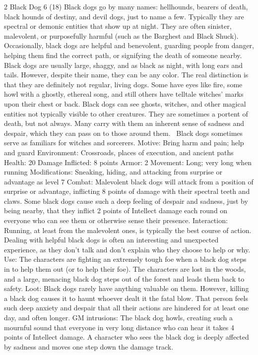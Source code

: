 \begin{multicols}{2}
Black Dog 6 (18)
Black dogs go by many names: hellhounds, bearers of death, black hounds of destiny, and devil dogs, just to name a few. Typically they are spectral or demonic entities that show up at night. They are often sinister, malevolent, or purposefully harmful (such as the Barghest and Black Shuck). Occasionally, black dogs are helpful and benevolent, guarding people from danger, helping them find the correct path, or signifying the death of someone nearby.
Black dogs are usually large, shaggy, and as black as night, with long ears and tails. However, despite their name, they can be any color. The real distinction is that they are definitely not regular, living dogs. Some have eyes like fire, some howl with a ghostly, ethereal song, and still others have telltale witches’ marks upon their chest or back.
Black dogs can see ghosts, witches, and other magical entities not typically visible to other creatures. They are sometimes a portent of death, but not always. Many carry with them an inherent sense of sadness and despair, which they can pass on to those around them. 
	Black dogs sometimes serve as familiars for witches and sorcerers.
Motive: Bring harm and pain; help and guard
Environment: Crossroads, places of execution, and ancient paths Health: 20
Damage Inflicted: 8 points
Armor: 2
Movement: Long; very long when running
Modifications: Sneaking, hiding, and attacking from surprise or advantage as level 7 Combat: Malevolent black dogs will attack from a position of surprise or advantage,
inflicting 8 points of damage with their spectral teeth and claws. Some black dogs cause such a deep feeling of despair and sadness, just by being nearby, that they inflict 2 points of Intellect damage each round on everyone who can see them or otherwise sense their presence.
Interaction: Running, at least from the malevolent ones, is typically the best course
of action. Dealing with helpful black dogs is often an interesting and unexpected
experience, as they don’t talk and don’t explain who they choose to help or why. 
Use: The characters are fighting an extremely tough foe when a black dog steps in to
help them out (or to help their foe). The characters are lost in the woods, and a large,
menacing black dog steps out of the forest and leads them back to safety.
Loot: Black dogs rarely have anything valuable on them. However, killing a black dog causes
it to haunt whoever dealt it the fatal blow. That person feels such deep anxiety and despair that all their actions are hindered for at least one day, and often longer.
GM intrusions: The black dog howls, creating such a mournful sound that everyone in very long distance who can hear it takes 4 points of Intellect damage. A character who sees the black dog is deeply affected by sadness and moves one step down the damage track.


\end{multicols}
